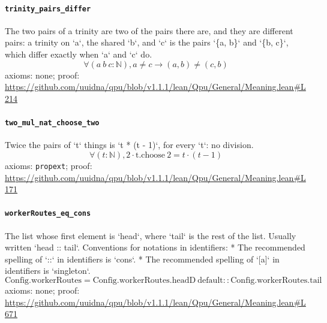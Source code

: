 \documentclass[11pt]{article}
\begin{document}
\paragraph{\texttt{trinity\_pairs\_differ}}
The two pairs of a trinity are two of the pairs there are, and they are different pairs: a trinity on `a`, the shared `b`, and `c` is the pairs `\{a, b\}` and `\{b, c\}`, which differ exactly when `a` and `c` do.
\[ \forall (a\ b\ c : \mathbb{N}), a \ne c \to (a, b) \ne (c, b) \]
\noindent axioms: none; proof: \url{https://github.com/uuidna/qpu/blob/v1.1.1/lean/Qpu/General/Meaning.lean\#L214}

\paragraph{\texttt{two\_mul\_nat\_choose\_two}}
Twice the pairs of `t` things is `t * (t - 1)`, for every `t`: no division.
\[ \forall (t : \mathbb{N}), 2 \cdot \mathrm{t.choose}\ 2 = t \cdot (t - 1) \]
\noindent axioms: \texttt{propext}; proof: \url{https://github.com/uuidna/qpu/blob/v1.1.1/lean/Qpu/General/Meaning.lean\#L171}

\paragraph{\texttt{workerRoutes\_eq\_cons}}
The list whose first element is `head`, where `tail` is the rest of the list. Usually written `head :: tail`.   Conventions for notations in identifiers:   * The recommended spelling of `::` in identifiers is `cons`.   * The recommended spelling of `[a]` in identifiers is `singleton`.
\[ \mathrm{Config.workerRoutes} = \mathrm{Config.workerRoutes.headD}\ \mathrm{default} :: \mathrm{Config.workerRoutes.tail} \]
\noindent axioms: none; proof: \url{https://github.com/uuidna/qpu/blob/v1.1.1/lean/Qpu/General/Meaning.lean\#L671}
\end{document}
